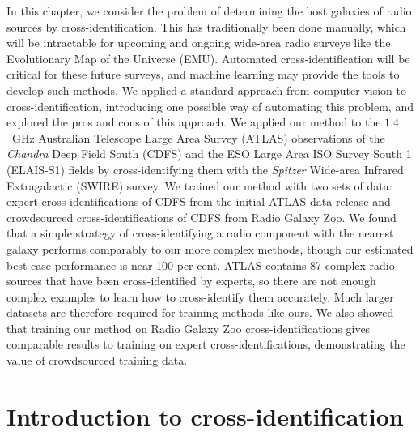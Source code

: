 \documentclass[11pt, a4paper]{book}
\begin{document}
In this chapter, we consider the problem of determining the host galaxies of radio sources by cross-identification. This has traditionally been done manually, which will be intractable for upcoming and ongoing wide-area radio surveys like the Evolutionary Map of the Universe (EMU). {Automated cross-identification will be critical for these future surveys, and machine learning may provide the tools to develop such methods. We applied a standard approach from computer vision to cross-identification, introducing one possible way of automating this problem, and explored the pros and cons of this approach}. We applied our method to the $1.4$~GHz Australian Telescope Large Area Survey (ATLAS) observations of the \emph{Chandra} Deep Field South (CDFS) and the ESO Large Area ISO Survey South 1 (ELAIS-S1) fields by cross-identifying them with the \emph{Spitzer} Wide-area Infrared Extragalactic (SWIRE) survey. We trained our method with two sets of data: expert cross-identifications of CDFS from the initial ATLAS data release and crowdsourced cross-identifications of CDFS from Radio Galaxy Zoo. {We found that a simple strategy of cross-identifying a radio component with the nearest galaxy performs comparably to our more complex methods, though our estimated best-case performance is near 100 per cent. ATLAS contains 87 complex radio sources that have been cross-identified by experts, so there are not enough complex examples to learn how to cross-identify them accurately. Much larger datasets are therefore required for training methods like ours. We also showed that training our method on Radio Galaxy Zoo cross-identifications gives comparable results to training on expert cross-identifications, demonstrating the value of crowdsourced training data.}

\section{Introduction to cross-identification}
\label{sec:atlas-xid-intro-cross-id}
\end{document}
